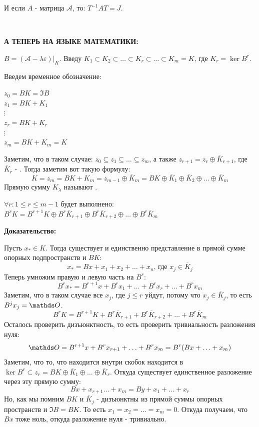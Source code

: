 И если $A$ - матрица $\mathcal{A}$, то: $T^{-1}AT=J$.

\,

\textbf{А ТЕПЕРЬ НА ЯЗЫКЕ МАТЕМАТИКИ:}

$B = (\mathcal{A}-\lambda\varepsilon)\Big|_{K}$. 
Введу $K_1 \subset K_2 \subset \ldots \subset K_r \subset \ldots \subset K_m = K$, где $K_r = \ker B^r$.

Введем временное обозначение:

$z_0 = BK = \Im B$\\
$z_1 = BK + K_1$\\
$\vdots$\\
$z_r = BK + K_r$\\
$\vdots$\\
$z_m = BK + K_m = K$

Заметим, что в таком случае: $z_0 \subseteq z_1 \subseteq \ldots \subseteq z_m $, а также $z_{r+1}= z_r \oplus \overline{K}_{r+1}$, где $\overline{K}_r$ - . Тогда заметим вот такую формулу:
$$K = z_m= BK+K_m  = z_{m-1} \oplus \overline{K}_m = BK \oplus\overline{K}_1 \oplus \overline{K}_2 \oplus \ldots \oplus \overline{K}_m$$ 
Прямую сумму $K_{\lambda}$ называют .


$\forall r: 1\leq r \leq m-1$ будет выполнено: $B^rK = B^{r+1}K \oplus B^r \overline{K}_{r+1}\oplus B^r \overline{K}_{r+2}\oplus\ldots\oplus B^r \overline{K}_m$

\textbf{Доказательство:}

Пусть $x_{*} \in K$. Тогда существует и единственно представление в прямой сумме опорных подпространств и $BK$:
$$x_{*} = Bx + x_1 + x_2 +\ldots +x_n\text{, где }x_j \in \overline{K}_{j}$$
Теперь умножим правую и левую часть на $B^r$:
$$B^r x_*  = B^{r+1}x + B^r x_1 +\ldots + B^r x_r + \ldots + B^r x_m$$
Заметим, что в таком случае все $x_j$, где $j\leq r$ уйдут, потому что $x_j \in \overline{K}_j$, то есть $B^{j}x_j = \zero$.
$$B^rK = B^{r+1}K + B^r \overline{K}_{r+1}+ B^r \overline{K}_{r+2}+\ldots+ B^r \overline{K}_m$$
Осталось проверить дизъюнктность, то есть проверить тривиальность разложения нуля:
$$\zero = B^{r+1}x + B^{r}x_{r+1} + \ldots + B^r x_m = B^r(Bx + \ldots +x_m)$$
Заметим, что то, что находится внутри скобок находится в $\ker B^r\subset z_r = BK\oplus \overline{K}_1 \oplus\ldots\oplus \overline{K}_r$. Откуда существует единственное разложение через эту прямую сумму:
$$Bx + x_{r+1}\ldots +x_m = By + x_1 +\ldots + x_r$$
Но, как мы помним $BK$ и $\overline{K}_j$ - дизъюнктны из прямой суммы опорных пространств и $\Im B =BK$.  То есть $x_1=x_2 =\ldots = x_m =0$. Откуда получаем, что $Bx$ тоже ноль, откуда разложение нуля - тривиально.

